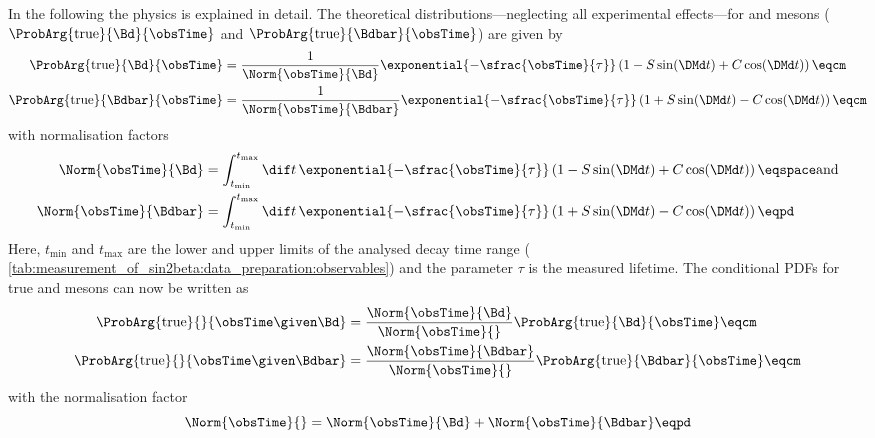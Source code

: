 In the following the \B physics \PDF is explained in detail. The theoretical
distributions---neglecting all experimental effects---for \Bd and \Bdbar mesons
($\ProbArg{\text{true}}{\Bd}{\obsTime}$ and $\ProbArg{\text{true}}{\Bdbar}{\obsTime}$)
are given by
%
\begin{equation}
  \begin{split}
    \ProbArg{\text{true}}{\Bd}{\obsTime}    &= \frac{1}{\Norm{\obsTime}{\Bd}}    \exponential{-\sfrac{\obsTime}{\tau}} \left( 1 - S \sin(\DMd t) + C \cos (\DMd t) \right)\eqcm \\
    \ProbArg{\text{true}}{\Bdbar}{\obsTime} &= \frac{1}{\Norm{\obsTime}{\Bdbar}} \exponential{-\sfrac{\obsTime}{\tau}} \left( 1 + S \sin(\DMd t) - C \cos (\DMd t) \right)\eqcm
  \end{split}
\end{equation}
%
with normalisation factors
%
\begin{equation}
  \begin{split}
    \Norm{\obsTime}{\Bd}    &= \int_{t_\text{min}}^{t_\text{max}} \dif t \, \exponential{-\sfrac{\obsTime}{\tau}} \left( 1 - S \sin (\DMd t) + C \cos (\DMd t) \right)\eqspace\text{and} \\
    \Norm{\obsTime}{\Bdbar} &= \int_{t_\text{min}}^{t_\text{max}} \dif t \, \exponential{-\sfrac{\obsTime}{\tau}} \left( 1 + S \sin (\DMd t) - C \cos (\DMd t) \right)\eqpd
  \end{split}
\end{equation}
%
Here, $t_\text{min}$ and $t_\text{max}$ are the lower and upper limits of the
analysed decay time range (\cf
\cref{tab:measurement_of_sin2beta:data_preparation:observables}) and the parameter $\tau$ is the measured \Bd
lifetime. The conditional \acp{PDF} for true \Bd and \Bdbar mesons can now be
written as
%
\begin{equation}
  \begin{split}
    \ProbArg{\text{true}}{}{\obsTime\given\Bd}    &= \frac{\Norm{\obsTime}{\Bd}}{\Norm{\obsTime}{}}    \ProbArg{\text{true}}{\Bd}{\obsTime}\eqcm \\
    \ProbArg{\text{true}}{}{\obsTime\given\Bdbar} &= \frac{\Norm{\obsTime}{\Bdbar}}{\Norm{\obsTime}{}} \ProbArg{\text{true}}{\Bdbar}{\obsTime}\eqcm
  \end{split}
\end{equation}
%
with the normalisation factor
%
\begin{equation}
  \Norm{\obsTime}{} = \Norm{\obsTime}{\Bd} + \Norm{\obsTime}{\Bdbar}\eqpd
\end{equation}
